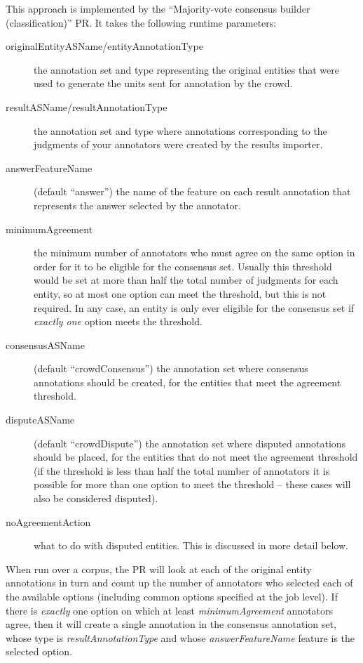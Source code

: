 This approach is implemented by the ``Majority-vote consensus builder
(classification)'' PR.  It takes the following runtime parameters:
\begin{description}
\item[originalEntityASName/entityAnnotationType] the annotation set and type
  representing the original entities that were used to generate the units sent
  for annotation by the crowd.
\item[resultASName/resultAnnotationType] the annotation set and type where
  annotations corresponding to the judgments of your annotators were created by
  the results importer.
\item[answerFeatureName] (default ``answer'') the name of the feature on each
  result annotation that represents the answer selected by the annotator.
\item[minimumAgreement] the minimum number of annotators who must agree on the
  same option in order for it to be eligible for the consensus set.  Usually
  this threshold would be set at more than half the total number of judgments
  for each entity, so at most one option can meet the threshold, but this is
  not required.  In any case, an entity is only ever eligible for the consensus
  set if \emph{exactly one} option meets the threshold.
\item[consensusASName] (default ``crowdConsensus'') the annotation set where
  consensus annotations should be created, for the entities that meet the
  agreement threshold.
\item[disputeASName] (default ``crowdDispute'') the annotation set where
  disputed annotations should be placed, for the entities that do not meet the
  agreement threshold (if the threshold is less than half the total number of
  annotators it is possible for more than one option to meet the threshold --
  these cases will also be considered disputed).
\item[noAgreementAction] what to do with disputed entities.  This is discussed
  in more detail below.
\end{description}

When run over a corpus, the PR will look at each of the original entity
annotations in turn and count up the number of annotators who selected each of
the available options (including common options specified at the job level).
If there is \emph{exactly} one option on which at least \emph{minimumAgreement}
annotators agree, then it will create a single annotation in the consensus
annotation set, whose type is \emph{resultAnnotationType} and whose
\emph{answerFeatureName} feature is the selected option.

